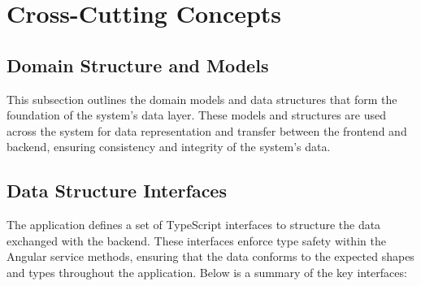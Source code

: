 \section{Cross-Cutting Concepts}\label{sec:cross-cutting-concepts}

\subsection{Domain Structure and Models}\label{subsec:domain-structure-and-models}
This subsection outlines the domain models and data structures that form the foundation of the system's data layer.
These models and structures are used across the system for data representation and transfer between the frontend and backend, ensuring consistency and integrity of the system's data.

\subsection{Data Structure Interfaces}
\label{subsec:data-structures}

The application defines a set of TypeScript interfaces to structure the data exchanged with the backend.
These interfaces enforce type safety within the Angular service methods, ensuring that the data conforms to the expected shapes and types throughout the application.
Below is a summary of the key interfaces:


